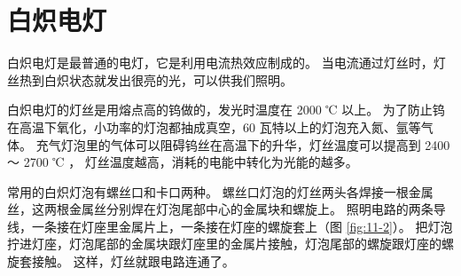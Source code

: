 \section{白炽电灯}\label{sec:11-2}

白炽电灯是最普通的电灯，它是利用电流热效应制成的。
当电流通过灯丝时，灯丝热到白炽状态\footnotemark 就发出很亮的光，可以供我们照明。

白炽电灯的灯丝是用熔点高的钨做的，发光时温度在 2000 ℃ 以上。
为了防止钨在高温下氧化，小功率的灯泡都抽成真空，60 瓦特以上的灯泡充入氮、氩等气体。
充气灯泡里的气体可以阻碍钨丝在高温下的升华，灯丝温度可以提高到 2400 ～ 2700 ℃ ，
灯丝温度越高，消耗的电能中转化为光能的越多。

常用的白炽灯泡有螺丝口和卡口两种。
螺丝口灯泡的灯丝两头各焊接一根金属丝，这两根金属丝分别焊在灯泡尾部中心的金属块和螺旋上。
照明电路的两条导线，一条接在灯座里金属片上，一条接在灯座的螺旋套上（图 \ref{fig:11-2}）。
把灯泡拧进灯座，灯泡尾部的金属块跟灯座里的金属片接触，灯泡尾部的螺旋跟灯座的螺旋套接触。
这样，灯丝就跟电路连通了。


